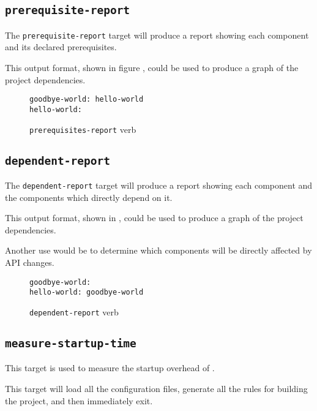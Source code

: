 \subsection{\texttt{prerequisite-report}}

The \texttt{prerequisite-report} target will produce a report showing
each component and its declared prerequisites.

This output format, shown in figure
, could be used to produce a
graph of the project dependencies.

\begin{figure}[tbh]
\hrulefill
\begin{verbatim}
goodbye-world: hello-world
hello-world:
\end{verbatim}
\hrulefill
\caption{\texttt{prerequisites-report} verb}\label{usinglmsbw:prerequisites-verb}
\end{figure}


\subsection{\texttt{dependent-report}}

The \texttt{dependent-report} target will produce a report showing
each component and the components which directly depend on it.

This output format, shown in ,
could be used to produce a graph of the project dependencies.

Another use would be to determine which components will be directly
affected by API changes.

\begin{figure}[tbh]
\hrulefill
\begin{verbatim}
goodbye-world:
hello-world: goodbye-world
\end{verbatim}
\hrulefill
\caption{\texttt{dependent-report} verb}\label{usinglmsbw:dependents-verb}
\end{figure}


\subsection{\texttt{measure-startup-time}}\label{usinglmsbw:measure-startup-time}

This target is used to measure the startup overhead of \lmsbw.

This target will load all the configuration files, generate all the
rules for building the project, and then immediately exit.

